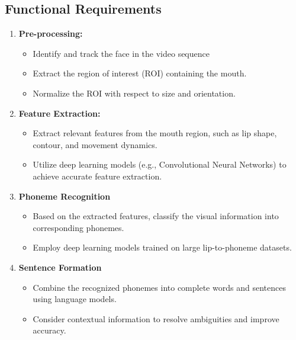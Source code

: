 \subsection{Functional Requirements}
\begin{enumerate}
\item \textbf{Pre-processing:}
\begin{itemize}
\item Identify and track the face in the video sequence
\item Extract the region of interest (ROI) containing the mouth.
\item Normalize the ROI with respect to size and orientation. 

\end{itemize}
\item  \textbf{Feature Extraction:}
\begin{itemize}
\item Extract relevant features from the mouth region, such as lip shape, contour, and movement dynamics. 
\item Utilize deep learning models (e.g., Convolutional Neural Networks) to achieve accurate feature extraction.


\end{itemize}
\item \textbf{Phoneme Recognition}
\begin{itemize}
\item Based on the extracted features, classify the visual information into corresponding phonemes.
\item Employ deep learning models trained on large lip-to-phoneme datasets.


\end{itemize}
\item \textbf{Sentence Formation}
\begin{itemize}
\item Combine the recognized phonemes into complete words and sentences using language models. 
\item Consider contextual information to resolve ambiguities and improve accuracy.


\end{itemize}


\end{enumerate}
